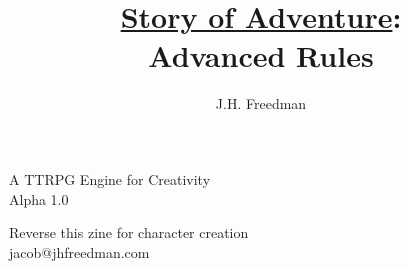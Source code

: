 \documentclass[statementpaper,oneside,article,14pt]{memoir}
\newcommand{\BackgroundPic}[1]{%
	\put(0,0){%
		\parbox[b][\paperheight]{\paperwidth}{%
			\vfill
			\centering
			{\transparent{0.4} \texttt{[image: \#1]}}%
			\vfill
}}}
\begin{document}
	
	
	\title{\underline{Story of Adventure}:\\Advanced Rules}
	\author{J.H. Freedman}
	\date{}
	
	\begingroup
	\let\cleardoublepage\clearpage
	
	
	\begin{titlingpage}
		\maketitle
		
		A TTRPG Engine for Creativity\\Alpha 1.0
		
	\end{titlingpage}
	
	\endgroup
	
	\pagestyle{empty}
	
	
	

	
	
	
	
	\newpage
	
	Reverse this zine for character creation
	\\jacob@jhfreedman.com
	
\end{document}
